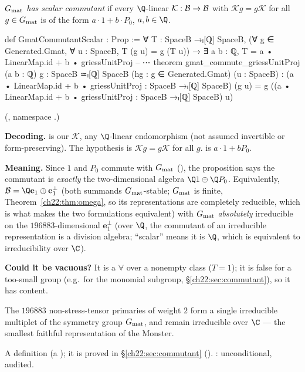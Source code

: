 \begin{definition}\label{ch22:def:commutant}
\emph{$G_{\mathrm{mat}}$ has scalar commutant} if every $\Q$-linear $\mathcal K:\mathcal{B}\to\mathcal{B}$ with $\mathcal Kg=g\mathcal K$ for
all $g\in G_{\mathrm{mat}}$ is of the form $a\cdot1+b\cdot P_0$, $a,b\in\Q$.
\end{definition}
\begin{leancode}
def GmatCommutantScalar : Prop :=
  ∀ T : SpaceB →ₗ[ℚ] SpaceB, (∀ g ∈ Generated.Gmat, ∀ u : SpaceB, T (g u) = g (T u)) →
    ∃ a b : ℚ, T = a • LinearMap.id + b • griessUnitProj
-- ⋯
theorem gmat_commute_griessUnitProj (a b : ℚ) {g : SpaceB ≃ₗ[ℚ] SpaceB}
    (hg : g ∈ Generated.Gmat) (u : SpaceB) :
    (a • LinearMap.id + b • griessUnitProj : SpaceB →ₗ[ℚ] SpaceB) (g u)
      = g ((a • LinearMap.id + b • griessUnitProj : SpaceB →ₗ[ℚ] SpaceB) u)
\end{leancode}
(, namespace .)
\begin{dictionary}
\textbf{Decoding.}   is our $\mathcal K$, any $\Q$-linear endomorphism (not assumed invertible or
form-preserving).  The hypothesis  is $\mathcal Kg=g\mathcal K$ for all $g$.
 is $a\cdot1+bP_0$.

\textbf{Meaning.}  Since $1$ and $P_0$ commute with $G_{\mathrm{mat}}$ (), the proposition
says the commutant is \emph{exactly} the two-dimensional algebra $\Q1\oplus\Q P_0$.  Equivalently,
$\chtwentytwoB=\Q \mathbf{e}_1\oplus \mathbf{e}_1^\perp$ (both summands $G_{\mathrm{mat}}$-stable; $G_{\mathrm{mat}}$ is finite,
Theorem~\ref{ch22:thm:omega}, so its representations are completely reducible, which is what makes the two formulations
equivalent) with $G_{\mathrm{mat}}$ \emph{absolutely} irreducible on the $196883$-dimensional
$\mathbf{e}_1^\perp$ (over $\Q$, the commutant of an irreducible representation is a division algebra; ``scalar'' means it is $\Q$,
which is equivalent to irreducibility over $\C$).

\textbf{Could it be vacuous?}  It is a $\forall$ over a nonempty class ($T=1$); it is false for a too-small group (e.g.\ for
the monomial subgroup, \S\ref{ch22:sec:commutant}), so it has content.
\end{dictionary}
\begin{physics}
The $196883$ non-stress-tensor primaries of weight $2$ form a single irreducible multiplet of the symmetry group
$G_{\mathrm{mat}}$, and remain irreducible over $\C$ --- the smallest faithful representation of the Monster.
\end{physics}
\begin{status}A definition (a ); it is proved in \S\ref{ch22:sec:commutant} ().
: unconditional, audited.\end{status}

